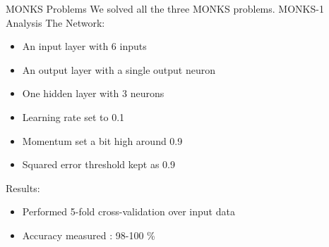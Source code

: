 \documentclass{beamer}
\begin{document}
\begin{frame}{MONKS Problems}
We solved all the three MONKS problems.\newline
MONKS-1 Analysis
The Network:
\begin{itemize}
	\item An input layer with 6 inputs
    \item An output layer with a single output neuron
    \item One hidden layer with 3 neurons
    \item Learning rate set to 0.1
    \item Momentum set a bit high around 0.9
    \item Squared error threshold kept as 0.9
    \newline 
\end{itemize}
Results:
\begin{itemize}
	\item Performed 5-fold cross-validation over input data
    \item Accuracy measured : 98-100 \%    
\end{itemize}
\end{frame}
\end{document}
